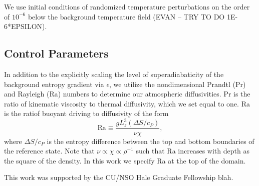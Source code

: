 \documentclass[aps, prl, twocolumn, groupedaddress]{revtex4-1}
\begin{document}
We use initial conditions of randomized temperature perturbations on the order of $10^{-6}$ below the background
temperature field (EVAN -- TRY TO DO 1E-6*EPSILON). 

\subsection{Control Parameters}
In addition to the explicitly scaling the level of superadiabaticity of the background entropy gradient via $\epsilon$,
we utilize the nondimensional Prandtl (Pr) and Rayleigh (Ra) numbers to determine our atmospheric diffusivities.  Pr
is the ratio of kinematic viscosity to thermal diffusivity, which we set equal to one.  Ra is the ratiof buoyant driving
to diffusivity of the form
\begin{equation}
\text{Ra} \equiv \frac{g L_z^3 (\Delta S/c_P)}{\nu\chi},
	\label{eqn:ra_def}
\end{equation}
where $\Delta S/c_P$ is the entropy difference between the top and bottom boundaries of the reference state.  Note that
$\nu \propto \chi \propto \rho^{-1}$ such that Ra increases with depth as the square of the density.  In this work we
specify Ra at the top of the domain.

\begin{acknowledgements}
This work was supported by the CU/NSO Hale Graduate Fellowship blah.
\end{acknowledgements}


\end{document}
